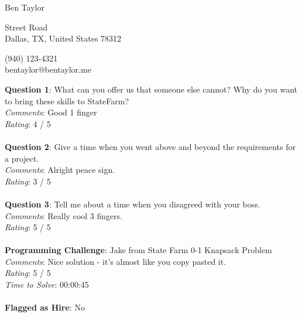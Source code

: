 \documentclass[12pt]{article}
\begin{document}
{\LARGE \begin{center}Ben Taylor\end{center}}

\begin{multicols}{2}
 Street Road \\
Dallas, TX, United States 78312
\columnbreak

\noindent
(940) 123-4321 \\
bentaylor@bentaylor.me
\end{multicols}

\noindent
\textbf{Question 1}: What can you offer us that someone else cannot? Why do you want to bring these skills to StateFarm?
\\\noindent
\textit{Comments}: Good 1 finger
\\\noindent
\textit{Rating}: 4 / 5
\\\\
\noindent
\textbf{Question 2}: Give a time when you went above and beyond the requirements for a project.
\\\noindent
\textit{Comments}: Alright peace sign.
\\\noindent
\textit{Rating}: 3 / 5
\\\\
\noindent
\textbf{Question 3}: Tell me about a time when you disagreed with your boss.
\\\noindent
\textit{Comments}: Really cool 3 fingers.
\\\noindent
\textit{Rating}: 5 / 5
\\\\
\noindent
\textbf{Programming Challenge}: Jake from State Farm 0-1 Knapsack Problem
\\\noindent
\textit{Comments}: Nice solution - it's almost like you copy pasted it.
\\\noindent
\textit{Rating}: 5 / 5
\\\noindent
\textit{Time to Solve}: 00:00:45
\\\\
\textbf{Flagged as Hire}: No
\\\\ 
\end{document}
